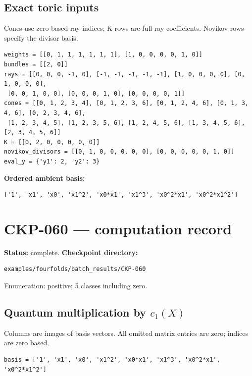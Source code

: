 \documentclass[10pt,a4paper]{article}
\begin{document}
\subsection*{Exact toric inputs}
Cones use zero-based ray indices; K rows are full ray coefficients. Novikov rows specify the divisor basis.

\begin{lstlisting}
weights = [[0, 1, 1, 1, 1, 1, 1], [1, 0, 0, 0, 0, 1, 0]]
bundles = [[2, 0]]
rays = [[0, 0, 0, -1, 0], [-1, -1, -1, -1, -1], [1, 0, 0, 0, 0], [0, 1, 0, 0, 0],
 [0, 0, 1, 0, 0], [0, 0, 0, 1, 0], [0, 0, 0, 0, 1]]
cones = [[0, 1, 2, 3, 4], [0, 1, 2, 3, 6], [0, 1, 2, 4, 6], [0, 1, 3, 4, 6], [0, 2, 3, 4, 6],
 [1, 2, 3, 4, 5], [1, 2, 3, 5, 6], [1, 2, 4, 5, 6], [1, 3, 4, 5, 6], [2, 3, 4, 5, 6]]
K = [[0, 2, 0, 0, 0, 0, 0]]
novikov_divisors = [[0, 1, 0, 0, 0, 0, 0], [0, 0, 0, 0, 0, 1, 0]]
eval_y = {'y1': 2, 'y2': 3}
\end{lstlisting}

\textbf{Ordered ambient basis:}
\begin{lstlisting}
['1', 'x1', 'x0', 'x1^2', 'x0*x1', 'x1^3', 'x0^2*x1', 'x0^2*x1^2']
\end{lstlisting}

\clearpage\section*{CKP-060 --- computation record}
\textbf{Status:} complete.
\textbf{Checkpoint directory:}
\begin{lstlisting}
examples/fourfolds/batch_results/CKP-060
\end{lstlisting}

Enumeration: positive; 5 classes including zero.
\subsection*{Quantum multiplication by $c_1(X)$}
Columns are images of basis vectors. All omitted matrix entries are zero; indices are zero based.

\begin{lstlisting}
basis = ['1', 'x1', 'x0', 'x1^2', 'x0*x1', 'x1^3', 'x0^2*x1', 'x0^2*x1^2']
\end{lstlisting}
\end{document}
